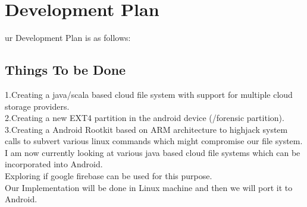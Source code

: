 %
%
\let\textcircled=\pgftextcircled
\chapter{Development Plan}
\label{chap:plan}

ur Development Plan is as follows:\\
\section{Things To be Done}
1.Creating a java/scala based cloud file system with support for multiple cloud storage providers.\\
2.Creating a new EXT4 partition in the android device (/forensic partition).\\
3.Creating a Android Rootkit based on ARM architecture to highjack system calls to subvert various linux commands which might compromise our file system.\\

I am now currently looking at various java based cloud file systems which can be incorporated into Android.\\
 
Exploring if google firebase can be used for this purpose.\\

Our Implementation will be done in Linux machine and then we will port it to Android.


